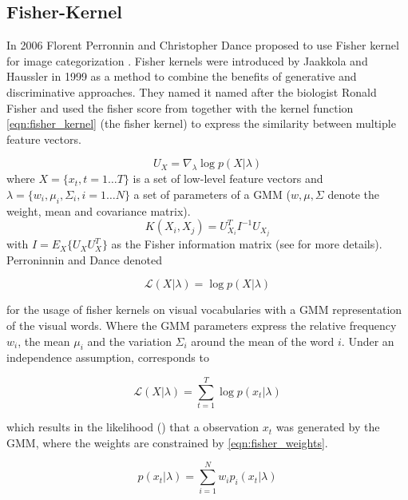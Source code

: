 \subsection{Fisher-Kernel}
\label{sec:fisher}

In 2006 Florent Perronnin and Christopher Dance proposed to use Fisher kernel for image categorization \cite{Perronnin2006}. Fisher kernels were introduced by Jaakkola and Haussler in 1999 as a method to combine the benefits of generative and discriminative approaches. They named it named after the biologist Ronald Fisher and used the fisher score from  together with the kernel function \ref{eqn:fisher_kernel} (the fisher kernel) to express the similarity between multiple feature vectors. 

\begin{equation}
U_X = \nabla_\lambda \log p(X|\lambda)
\label{eqn:fisher_score}
\end{equation}
where $X = \{x_t, t = 1 \dots T\}$ is a set of low-level feature vectors and $\lambda = \{w_i, \mu_i, \Sigma_i, i = 1 \dots N\}$ a set of parameters of a \acf{GMM} ($w, \mu, \Sigma$ denote the weight, mean and covariance matrix).
\begin{equation}
K(X_i, X_j) = U_{X_i}^T I^{-1} U_{X_j}
\label{eqn:fisher_kernel}
\end{equation}
with $I = E_X\{U_X U_X^T\}$ as the Fisher information matrix (see \cite{amari1998natural} for more details). Perroninnin and Dance denoted

\begin{equation}
\mathcal{L} (X|\lambda) = \log p(X|\lambda)
\label{eqn:fisher:score2}
\end{equation}

for the usage of fisher kernels on visual vocabularies with a \ac{GMM} representation of the visual words. Where the \ac{GMM} parameters express the relative frequency $w_i$, the mean $\mu_i$ and the variation $\Sigma_i$ around the mean of the word $i$. Under an independence assumption,  corresponds to

\begin{equation}
\mathcal{L} (X|\lambda) = \sum_{t=1}^{T} \log p(x_t|\lambda)
\end{equation}

which results in the likelihood () that a observation $x_t$ was generated by the \ac{GMM}, where the weights are constrained by \ref{eqn:fisher_weights}.

\begin{equation}
p(x_t|\lambda) = \sum_{i=1}^{N} w_i p_i (x_t|\lambda)
\label{eqn:fisher_likelihood}
\end{equation}


